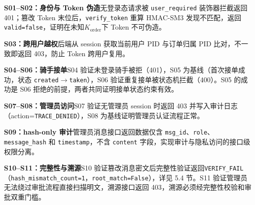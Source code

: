 \textbf{S01--S02：身份与 Token 伪造}\quad 无登录态请求被 \texttt{user\_required} 装饰器拦截返回 401；篡改 Token 末位后，\texttt{verify\_token} 重算 HMAC-SM3 发现不匹配，返回 \texttt{valid=false}，证明在未知$K_{\mathrm{order}}$下 Token 不可伪造。

\textbf{S03：跨用户越权}\quad 后端从 session 获取当前用户 PID 与订单归属 PID 比对，不一致即返回 403，防止 Token 跨用户复用。

\textbf{S04--S06：骑手接单}\quad S04 验证未登录骑手被拒（401），S05 为基线（首次接单成功，状态 \texttt{created}$\to$\texttt{taken}），S06 验证重复接单被状态机拦截（400）。S05 的成功是 S06 拒绝的前提，两者共同证明接单状态约束有效。

\textbf{S07--S08：管理员访问}\quad S07 验证无管理员 session 时返回 403 并写入审计日志（action=\texttt{TRACE\_DENIED}），S08 为基线证明管理员认证流程正常。

\textbf{S09：hash-only 审计}\quad 管理员消息接口返回数据仅含 \texttt{msg\_id}、\texttt{role}、\texttt{message\_hash} 和 \texttt{timestamp}，不含 \texttt{content} 字段，实现审计与隐私访问的接口级权限分离。

\textbf{S10--S11：完整性与溯源}\quad S10 验证篡改消息密文后完整性验证返回\texttt{VERIFY\_FAIL}（\texttt{hash\_mismatch\_count=1}，\texttt{root\_match=False}），详见 5.4 节。S11 验证管理员无法绕过审批流程直接扫描明文，溯源接口返回 403，溯源必须经完整性校验和审批双重门槛。
